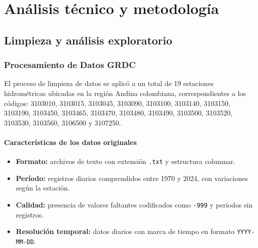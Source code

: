 \chapter{Análisis técnico y metodología}
\label{chp:2}

\section{Limpieza y análisis exploratorio}
\label{sec:chp2-1}

\subsection{Procesamiento de Datos GRDC}
El proceso de limpieza de datos se aplicó a un total de 19 estaciones hidrométricas ubicadas en la región Andina colombiana, correspondientes a los códigos: 3103010, 3103015, 3103045, 3103090, 3103100, 3103140, 3103150, 3103190, 3103450, 3103465, 3103470, 3103480, 3103490, 3103500, 3103520, 3103530, 3103560, 3106500 y 3107250.

\subsubsection*{Características de los datos originales}
\begin{itemize}
    \item \textbf{Formato:} archivos de texto con extensión \texttt{.txt} y estructura columnar.
    \item \textbf{Período:} registros diarios comprendidos entre 1970 y 2024, con variaciones según la estación.
    \item \textbf{Calidad:} presencia de valores faltantes codificados como \texttt{-999} y períodos sin registros.
    \item \textbf{Resolución temporal:} datos diarios con marca de tiempo en formato \texttt{YYYY-MM-DD}.
\end{itemize}

